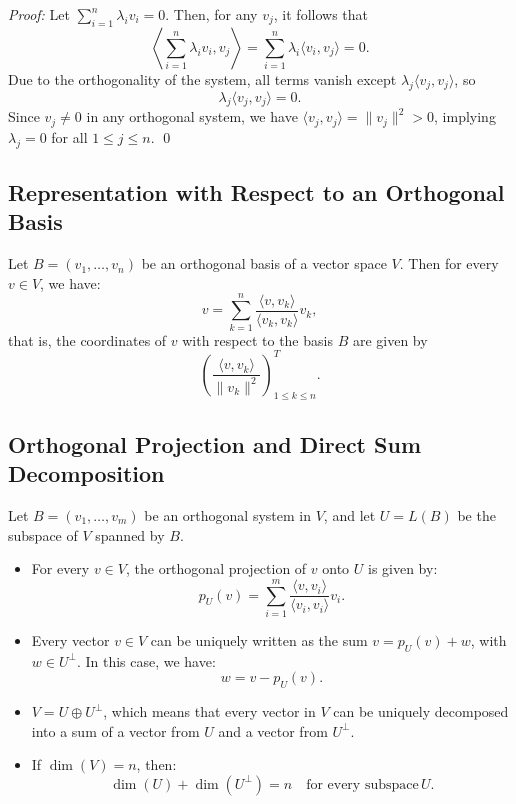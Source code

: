 \textit{Proof:} Let \( \sum_{i=1}^n \lambda_i v_i = 0 \). Then, for any \( v_j \), it follows that
\[
\left\langle \sum_{i=1}^n \lambda_i v_i, v_j \right\rangle = \sum_{i=1}^n \lambda_i \langle v_i, v_j \rangle = 0.
\]
Due to the orthogonality of the system, all terms vanish except \( \lambda_j \langle v_j, v_j \rangle \), so
\[
\lambda_j \langle v_j, v_j \rangle = 0.
\]
Since \( v_j \neq 0 \) in any orthogonal system, we have \( \langle v_j, v_j \rangle = \|v_j\|^2 > 0 \), implying \( \lambda_j = 0 \) for all \( 1 \leq j \leq n \). \qed

\subsection{Representation with Respect to an Orthogonal Basis}

Let \( B = (v_1, \ldots, v_n) \) be an orthogonal basis of a vector space \( V \). Then for every \( v \in V \), we have:
\[
v = \sum_{k=1}^n \frac{\langle v, v_k \rangle}{\langle v_k, v_k \rangle} v_k,
\]
that is, the coordinates of \( v \) with respect to the basis \( B \) are given by
\[
\left( \frac{\langle v, v_k \rangle}{\|v_k\|^2} \right)_{1 \leq k \leq n}^T.
\]


\subsection{Orthogonal Projection and Direct Sum Decomposition}

Let \( B = (v_1, \ldots, v_m) \) be an orthogonal system in \( V \), and let \( U = L(B) \) be the subspace of \( V \) spanned by \( B \).

\begin{itemize}[label=\(-\)]
    \item For every \( v \in V \), the orthogonal projection of \( v \) onto \( U \) is given by:
    \[
    p_U(v) = \sum_{i=1}^{m} \frac{\langle v, v_i \rangle}{\langle v_i, v_i \rangle} v_i.
    \]

    \item Every vector \( v \in V \) can be uniquely written as the sum \( v = p_U(v) + w \), with \( w \in U^\perp \). In this case, we have:
    \[
    w = v - p_U(v).
    \]

    \item \( V = U \oplus U^\perp \), which means that every vector in \( V \) can be uniquely decomposed into a sum of a vector from \( U \) and a vector from \( U^\perp \).

    \item If \( \dim(V) = n \), then:
    \[
    \dim(U) + \dim(U^\perp) = n \quad \text{for every subspace} \, U.
    \]
\end{itemize}

